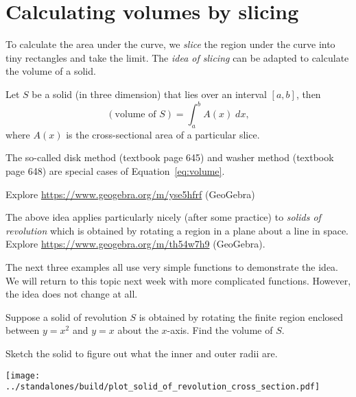 \documentclass[../main.tex]{subfiles}
\begin{document}
 \section{Calculating volumes by slicing}
  To calculate the area under the curve, we \emph{slice} the region under the curve into tiny rectangles and take the limit. The \emph{idea of slicing} can be adapted to calculate the volume of a solid.

  \begin{mdframed}[style=withref-compact]
    Let \(S\) be a solid (in three dimension) that lies over an interval \([a,b]\), then
    \begin{equation} \label{eq:volume}
      (\text{volume of } S) = \int_{a}^{b} A(x) \;dx,
    \end{equation}
    where \(A(x)\) is the cross-sectional area of a particular slice.

    The so-called disk method (textbook page 645) and washer method (textbook page 648) are special cases of Equation~\eqref{eq:volume}.
  \end{mdframed}

  {\footnotesize Explore \url{https://www.geogebra.org/m/yse5hfrf} (GeoGebra)}


  The above idea applies particularly nicely (after some practice) to \emph{solids of revolution} which is obtained by rotating a region in a plane about a line in space. \\
  {\footnotesize Explore \url{https://www.geogebra.org/m/th54w7h9} (GeoGebra).}
  \clearpage


  The next three examples all use very simple functions to demonstrate the idea. We will return to this topic next week with more complicated functions. However, the idea does not change at all.

  \begin{example}
    Suppose a solid of revolution \(S\) is obtained by rotating the finite region enclosed between \(y = x^{2}\) and \(y = x\) about the \(x\)-axis. Find the volume of \(S\).


    Sketch the solid to figure out what the inner and outer radii are.

    \texttt{[image: ../standalones/build/plot\_solid\_of\_revolution\_cross\_section.pdf]}
  \end{example}
  \clearpage
\end{document}
